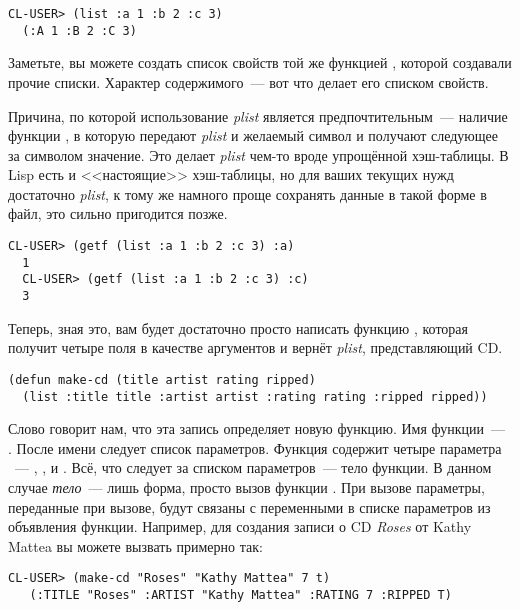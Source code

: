 \begin{lstlisting}[style=lisprepl]
  CL-USER> (list :a 1 :b 2 :c 3)
  (:A 1 :B 2 :C 3)
\end{lstlisting}

Заметьте, вы можете создать список свойств той же функцией , которой создавали
прочие списки. Характер содержимого~--- вот что делает его списком свойств.

Причина, по которой использование \textit{plist} является предпочтительным~--- наличие
функции , в которую передают \textit{plist} и желаемый символ и получают
следующее за символом значение. Это делает \textit{plist} чем-то вроде упрощённой
хэш-таблицы. В Lisp есть и <<настоящие>> хэш-таблицы, но для ваших текущих нужд достаточно
\textit{plist}, к тому же намного проще сохранять данные в такой форме в файл, это сильно
пригодится позже.

\begin{lstlisting}[style=lisprepl]
  CL-USER> (getf (list :a 1 :b 2 :c 3) :a)
  1
  CL-USER> (getf (list :a 1 :b 2 :c 3) :c)
  3
\end{lstlisting}

Теперь, зная это, вам будет достаточно просто написать функцию , которая
получит четыре поля в качестве аргументов и вернёт \textit{plist}, представляющий CD.

\begin{lstlisting}
(defun make-cd (title artist rating ripped)
  (list :title title :artist artist :rating rating :ripped ripped))
\end{lstlisting}

Слово  говорит нам,
что эта запись определяет новую функцию. Имя функции~---
. После имени следует список параметров. Функция содержит четыре параметра
~--- , ,  и . Всё, что следует за
списком параметров~--- тело функции. В данном случае \textit{тело}~--- лишь форма, просто
вызов функции . При вызове  параметры, переданные при вызове,
будут связаны с переменными в списке параметров из объявления функции. Например, для
создания записи о CD \textit{Roses} от Kathy Mattea вы можете вызвать 
примерно так:

\begin{lstlisting}[style=lisprepl]
   CL-USER> (make-cd "Roses" "Kathy Mattea" 7 t)
   (:TITLE "Roses" :ARTIST "Kathy Mattea" :RATING 7 :RIPPED T) 
\end{lstlisting}

